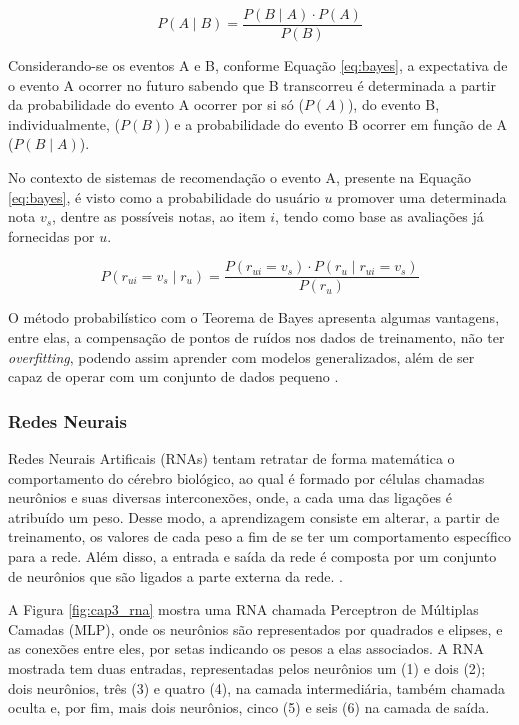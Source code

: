         \begin{equation}
            P(A \mid B) = \frac{P(B \mid A) \cdot P(A)}{P(B)} \label{eq:bayes}
        \end{equation}

        Considerando-se os eventos A e B, conforme Equação \ref{eq:bayes}, a expectativa de o evento A ocorrer no futuro sabendo que B transcorreu é determinada a partir da probabilidade do evento A ocorrer por si só ($P(A)$), do evento B, individualmente, ($P(B)$) e a probabilidade do evento B ocorrer em função de A ($P (B \mid A)$).
        
        No contexto de sistemas de recomendação o evento A, presente na Equação \ref{eq:bayes}, é visto como a probabilidade do usuário $u$ promover uma determinada nota $v_s$, dentre as possíveis notas, ao item $i$, tendo como base as avaliações já fornecidas por $u$. \cite{Aggarwal2016}
        
        \begin{equation}
              P(r_{ui} = v_s \mid r_u) = \frac{P(r_{ui}=v_s) \cdot P(r_u \mid r_{ui} = v_s)}{P(r_u)}
        \end{equation}
        
        O método probabilístico com o Teorema de Bayes apresenta algumas vantagens, entre elas, a compensação de pontos de ruídos nos dados de treinamento, não ter \textit{overfitting}, podendo assim aprender com modelos generalizados, além de ser capaz de operar com um conjunto de dados pequeno \cite{Jannach2010}.
                
        \subsubsection{Redes Neurais}
        Redes Neurais Artificais (RNAs) tentam retratar de forma matemática o comportamento do cérebro biológico, ao qual é formado por células chamadas neurônios e suas diversas interconexões, onde, a cada uma das ligações é atribuído um peso. Desse modo, a aprendizagem consiste em alterar, a partir de treinamento, os valores de cada peso a fim de se ter um comportamento específico para a rede. Além disso, a entrada e saída da rede é composta por um conjunto de neurônios que são ligados a parte externa da rede. \cite{Russell2009}. 
        
        A Figura \ref{fig:cap3_rna} mostra uma RNA chamada Perceptron de Múltiplas Camadas (MLP), onde os neurônios são representados por quadrados e elipses, e as conexões entre eles, por setas indicando os pesos a elas associados. A RNA mostrada tem duas entradas, representadas pelos neurônios um (1) e dois (2); dois neurônios, três (3) e quatro (4), na camada intermediária, também chamada oculta e, por fim, mais dois neurônios, cinco (5) e seis (6) na camada de saída.
        
